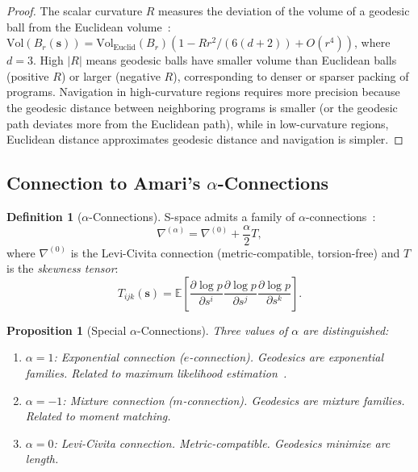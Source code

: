 \documentclass[11pt,twocolumn,a4paper]{article}
\newtheorem{proposition}[theorem]{Proposition}
\theoremstyle{definition}
\newtheorem{definition}[theorem]{Definition}
\begin{document}
\begin{proof}
The scalar curvature $R$ measures the deviation of the volume of a geodesic ball from
the Euclidean volume~\cite{nakahara2003}:
$\mathrm{Vol}(B_r(\mathbf{s})) = \mathrm{Vol}_{\mathrm{Euclid}}(B_r)(1 - R r^2/(6(d+2)) + O(r^4))$,
where $d = 3$. High $|R|$ means geodesic balls have smaller volume than Euclidean balls
(positive $R$) or larger (negative $R$), corresponding to denser or sparser packing of
programs. Navigation in high-curvature regions requires more precision because the
geodesic distance between neighboring programs is smaller (or the geodesic path deviates
more from the Euclidean path), while in low-curvature regions, Euclidean distance
approximates geodesic distance and navigation is simpler.
\end{proof}

\subsection{Connection to Amari's $\alpha$-Connections}\label{sec:infogeo:amari}

\begin{definition}[$\alpha$-Connections]\label{def:alpha_connections}
S-space admits a family of $\alpha$-connections~\cite{amari1985,amari2000}:
\begin{equation}\label{eq:alpha_connection}
  \nabla^{(\alpha)} = \nabla^{(0)} + \frac{\alpha}{2} T,
\end{equation}
where $\nabla^{(0)}$ is the Levi-Civita connection (metric-compatible, torsion-free) and
$T$ is the \emph{skewness tensor}:
\begin{equation}\label{eq:skewness}
  T_{ijk}(\mathbf{s}) = \mathbb{E}\!\left[\frac{\partial \log p}{\partial s^i}
  \frac{\partial \log p}{\partial s^j} \frac{\partial \log p}{\partial s^k}\right].
\end{equation}
\end{definition}

\begin{proposition}[Special $\alpha$-Connections]\label{prop:special_alpha}
Three values of $\alpha$ are distinguished:
\begin{enumerate}[label=(\roman*)]
  \item $\alpha = 1$: \emph{Exponential connection} ($e$-connection). Geodesics are
        exponential families. Related to maximum likelihood estimation~\cite{amari1985}.
  \item $\alpha = -1$: \emph{Mixture connection} ($m$-connection). Geodesics are mixture
        families. Related to moment matching.
  \item $\alpha = 0$: \emph{Levi-Civita connection}. Metric-compatible. Geodesics
        minimize arc length.
\end{enumerate}
\end{proposition}
\end{document}
